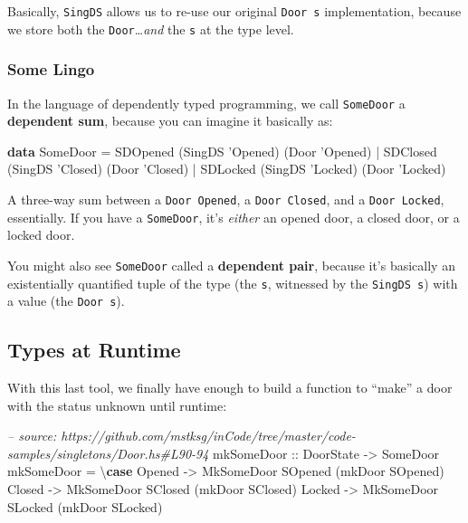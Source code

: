 \documentclass[]{article}
\newenvironment{Shaded}{}{}
\newcommand{\KeywordTok}[1]{\textcolor[rgb]{0.00,0.44,0.13}{\textbf{#1}}}
\newcommand{\DataTypeTok}[1]{\textcolor[rgb]{0.56,0.13,0.00}{#1}}
\newcommand{\CharTok}[1]{\textcolor[rgb]{0.25,0.44,0.63}{#1}}
\newcommand{\CommentTok}[1]{\textcolor[rgb]{0.38,0.63,0.69}{\textit{#1}}}
\newcommand{\OtherTok}[1]{\textcolor[rgb]{0.00,0.44,0.13}{#1}}
\newcommand{\FunctionTok}[1]{\textcolor[rgb]{0.02,0.16,0.49}{#1}}
\newcommand{\NormalTok}[1]{#1}
\begin{document}
Basically, \texttt{SingDS} allows us to re-use our original \texttt{Door\ s}
implementation, because we store both the \texttt{Door}\ldots{}\emph{and} the
\texttt{s} at the type level.

\subsubsection{Some Lingo}\label{some-lingo}

In the language of dependently typed programming, we call \texttt{SomeDoor} a
\textbf{dependent sum}, because you can imagine it basically as:

\begin{Shaded}
\begin{Highlighting}[]
\KeywordTok{data} \DataTypeTok{SomeDoor} \FunctionTok{=} \DataTypeTok{SDOpened}\NormalTok{ (}\DataTypeTok{SingDS} \CharTok{'Opened) (Door '}\DataTypeTok{Opened}\NormalTok{)}
              \FunctionTok{|} \DataTypeTok{SDClosed}\NormalTok{ (}\DataTypeTok{SingDS} \CharTok{'Closed) (Door '}\DataTypeTok{Closed}\NormalTok{)}
              \FunctionTok{|} \DataTypeTok{SDLocked}\NormalTok{ (}\DataTypeTok{SingDS} \CharTok{'Locked) (Door '}\DataTypeTok{Locked}\NormalTok{)}
\end{Highlighting}
\end{Shaded}

A three-way sum between a \texttt{Door\ \textquotesingle{}Opened}, a
\texttt{Door\ \textquotesingle{}Closed}, and a
\texttt{Door\ \textquotesingle{}Locked}, essentially. If you have a
\texttt{SomeDoor}, it's \emph{either} an opened door, a closed door, or a locked
door.

You might also see \texttt{SomeDoor} called a \textbf{dependent pair}, because
it's basically an existentially quantified tuple of the type (the \texttt{s},
witnessed by the \texttt{SingDS\ s}) with a value (the \texttt{Door\ s}).

\subsection{Types at Runtime}\label{types-at-runtime}

With this last tool, we finally have enough to build a function to ``make'' a
door with the status unknown until runtime:

\begin{Shaded}
\begin{Highlighting}[]
\CommentTok{-- source: https://github.com/mstksg/inCode/tree/master/code-samples/singletons/Door.hs#L90-94}
\OtherTok{mkSomeDoor ::} \DataTypeTok{DoorState} \OtherTok{->} \DataTypeTok{SomeDoor}
\NormalTok{mkSomeDoor }\FunctionTok{=}\NormalTok{ \textbackslash{}}\KeywordTok{case}
    \DataTypeTok{Opened} \OtherTok{->} \DataTypeTok{MkSomeDoor} \DataTypeTok{SOpened}\NormalTok{ (mkDoor }\DataTypeTok{SOpened}\NormalTok{)}
    \DataTypeTok{Closed} \OtherTok{->} \DataTypeTok{MkSomeDoor} \DataTypeTok{SClosed}\NormalTok{ (mkDoor }\DataTypeTok{SClosed}\NormalTok{)}
    \DataTypeTok{Locked} \OtherTok{->} \DataTypeTok{MkSomeDoor} \DataTypeTok{SLocked}\NormalTok{ (mkDoor }\DataTypeTok{SLocked}\NormalTok{)}
\end{Highlighting}
\end{Shaded}
\end{document}
